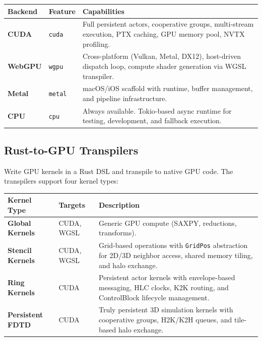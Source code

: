 \documentclass[11pt,a4paper]{article}
\begin{document}
\begin{table}[h!]
\centering
\renewcommand{\arraystretch}{1.2}
\begin{tabularx}{\textwidth}{>{\bfseries\color{brand}}l l X}
\toprule
\textbf{Backend} & \textbf{Feature} & \textbf{Capabilities} \\
\midrule
CUDA &
  \texttt{cuda} &
  Full persistent actors, cooperative groups, multi-stream execution,
  PTX caching, GPU memory pool, NVTX profiling. \\
WebGPU &
  \texttt{wgpu} &
  Cross-platform (Vulkan, Metal, DX12), host-driven dispatch loop,
  compute shader generation via WGSL transpiler. \\
Metal &
  \texttt{metal} &
  macOS/iOS scaffold with runtime, buffer management, and pipeline
  infrastructure. \\
CPU &
  \texttt{cpu} &
  Always available. Tokio-based async runtime for testing, development,
  and fallback execution. \\
\bottomrule
\end{tabularx}
\end{table}

\subsection{Rust-to-GPU Transpilers}

Write GPU kernels in a Rust DSL and transpile to native GPU code. The
transpilers support four kernel types:

\begin{table}[h!]
\centering
\renewcommand{\arraystretch}{1.2}
\begin{tabularx}{\textwidth}{>{\bfseries\color{brand}}l l X}
\toprule
\textbf{Kernel Type} & \textbf{Targets} & \textbf{Description} \\
\midrule
Global Kernels &
  CUDA, WGSL &
  Generic GPU compute (SAXPY, reductions, transforms). \\
Stencil Kernels &
  CUDA, WGSL &
  Grid-based operations with \texttt{GridPos} abstraction for 2D/3D
  neighbor access, shared memory tiling, and halo exchange. \\
Ring Kernels &
  CUDA &
  Persistent actor kernels with envelope-based messaging, HLC clocks,
  K2K routing, and ControlBlock lifecycle management. \\
Persistent FDTD &
  CUDA &
  Truly persistent 3D simulation kernels with cooperative groups,
  H2K/K2H queues, and tile-based halo exchange. \\
\bottomrule
\end{tabularx}
\end{table}
\end{document}

